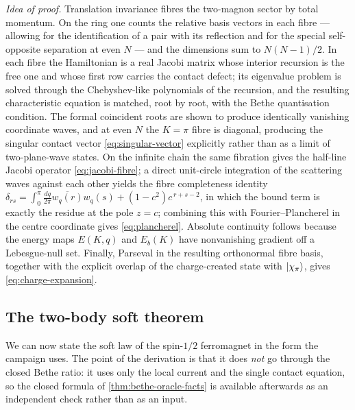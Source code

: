 \emph{Idea of proof.} Translation invariance fibres the two-magnon sector by
total momentum. On the ring one counts the relative basis vectors in each
fibre --- allowing for the identification of a pair with its reflection and
for the special self-opposite separation at even $N$ --- and the dimensions
sum to $N(N-1)/2$. In each fibre the Hamiltonian is a real Jacobi matrix whose
interior recursion is the free one and whose first row carries the contact
defect; its eigenvalue problem is solved through the Chebyshev-like
polynomials of the recursion, and the resulting characteristic equation is
matched, root by root, with the Bethe quantisation condition. The formal
coincident roots are shown to produce identically vanishing coordinate waves,
and at even $N$ the $K=\pi$ fibre is diagonal, producing the singular contact
vector \cref{eq:singular-vector} explicitly rather than as a limit of
two-plane-wave states. On the infinite chain the same fibration gives the
half-line Jacobi operator \cref{eq:jacobi-fibre}; a direct unit-circle
integration of the scattering waves against each other yields the fibre
completeness identity
$\delta_{rs}=\int_0^\pi\frac{dq}{2\pi}\overline{w_q(r)}w_q(s)+(1-c^2)c^{\,r+s-2}$,
in which the bound term is exactly the residue at the pole $z=c$; combining
this with Fourier--Plancherel in the centre coordinate gives
\cref{eq:plancherel}. Absolute continuity follows because the energy maps
$E(K,q)$ and $E_b(K)$ have nonvanishing gradient off a Lebesgue-null set.
Finally, Parseval in the resulting orthonormal fibre basis, together with the
explicit overlap of the charge-created state with $|\chi_\pi\rangle$, gives
\cref{eq:charge-expansion}.

\subsection{The two-body soft theorem}

We can now state the soft law of the spin-$1/2$ ferromagnet in the form the
campaign uses. The point of the derivation is that it does \emph{not} go
through the closed Bethe ratio: it uses only the local current and the single
contact equation, so the closed formula of \cref{thm:bethe-oracle-facts} is
available afterwards as an independent check rather than as an input.

